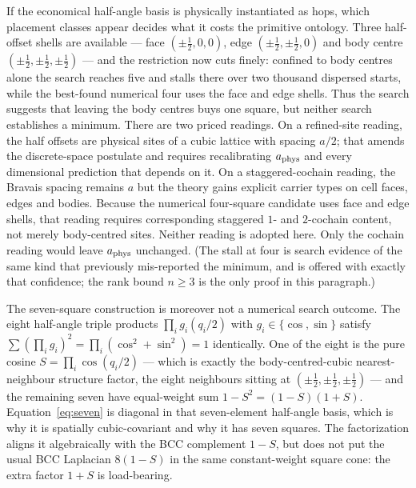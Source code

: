 \documentclass[11pt,a4paper]{article}
\theoremstyle{definition}
\theoremstyle{plain}
\theoremstyle{remark}
\begin{document}
If the economical half-angle basis is physically instantiated as hops,
which placement classes appear decides what it costs the primitive ontology.
Three half-offset shells are
available --- face $(\pm\tfrac12,0,0)$, edge $(\pm\tfrac12,\pm\tfrac12,0)$
and body centre $(\pm\tfrac12,\pm\tfrac12,\pm\tfrac12)$ --- and the
restriction now cuts finely: confined to body centres alone the search
reaches five and stalls there over two thousand dispersed starts, while
the best-found numerical four uses the face and edge shells. Thus the
search suggests that leaving the body centres buys one square, but neither
search establishes a minimum. There are two priced readings. On a
refined-site reading, the half offsets are physical sites of a cubic
lattice with spacing $a/2$; that amends the discrete-space postulate and
requires recalibrating $a_{\rm phys}$ and every dimensional prediction
that depends on it. On a staggered-cochain reading, the Bravais spacing
remains $a$ but the theory gains explicit carrier types on cell faces,
edges and bodies. Because the numerical four-square candidate uses face
and edge shells, that reading requires corresponding staggered $1$- and
$2$-cochain content, not merely body-centred sites. Neither reading is
adopted here. Only the cochain reading would leave $a_{\rm phys}$
unchanged. (The stall at four is search evidence of the same kind that
previously mis-reported the minimum, and is offered with exactly that
confidence; the rank bound $n\ge3$ is the only proof in this paragraph.)

The seven-square construction is moreover not a numerical search outcome.
The eight
half-angle triple products $\prod_ig_i(q_i/2)$ with $g_i\in\{\cos,\sin\}$
satisfy $\sum(\prod_ig_i)^2 = \prod_i(\cos^2+\sin^2) = 1$ identically. One
of the eight is the pure cosine $S = \prod_i\cos(q_i/2)$ --- which is
exactly the body-centred-cubic nearest-neighbour structure factor, the eight
neighbours sitting at $(\pm\tfrac12,\pm\tfrac12,\pm\tfrac12)$ --- and the
remaining seven have equal-weight sum
$1-S^2 = (1-S)(1+S)$. Equation~\eqref{eq:seven} is diagonal in that
seven-element half-angle basis, which is why it is spatially
cubic-covariant and why it has seven squares. The factorization aligns it
algebraically with the BCC complement $1-S$, but does not put the usual BCC
Laplacian $8(1-S)$ in the same constant-weight square cone: the extra
factor $1+S$ is load-bearing.
\end{document}
